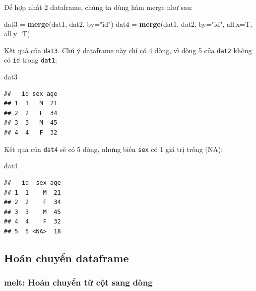 \documentclass[
]{book}
\newenvironment{Shaded}{\begin{snugshade}}{\end{snugshade}}
\newcommand{\DataTypeTok}[1]{\textcolor[rgb]{0.13,0.29,0.53}{#1}}
\newcommand{\KeywordTok}[1]{\textcolor[rgb]{0.13,0.29,0.53}{\textbf{#1}}}
\newcommand{\NormalTok}[1]{#1}
\newcommand{\StringTok}[1]{\textcolor[rgb]{0.31,0.60,0.02}{#1}}
\begin{document}
Để hợp nhất 2 dataframe, chúng ta dùng hàm merge như sau:

\begin{Shaded}
\begin{Highlighting}[]
\NormalTok{dat3 =}\StringTok{ }\KeywordTok{merge}\NormalTok{(dat1, dat2, }\DataTypeTok{by=}\StringTok{"id"}\NormalTok{)}
\NormalTok{dat4 =}\StringTok{ }\KeywordTok{merge}\NormalTok{(dat1, dat2, }\DataTypeTok{by=}\StringTok{"id"}\NormalTok{, }\DataTypeTok{all.x=}\NormalTok{T, }\DataTypeTok{all.y=}\NormalTok{T)}
\end{Highlighting}
\end{Shaded}

Kết quả của \texttt{dat3}. Chú ý dataframe này chỉ có 4 dòng, vì dòng 5 của \texttt{dat2} không có \texttt{id} trong \texttt{dat1}:

\begin{Shaded}
\begin{Highlighting}[]
\NormalTok{dat3}
\end{Highlighting}
\end{Shaded}

\begin{verbatim}
##   id sex age
## 1  1   M  21
## 2  2   F  34
## 3  3   M  45
## 4  4   F  32
\end{verbatim}

Kết quả của \texttt{dat4} sẽ có 5 dòng, nhưng biến \texttt{sex} có 1 giá trị trống (NA):

\begin{Shaded}
\begin{Highlighting}[]
\NormalTok{dat4}
\end{Highlighting}
\end{Shaded}

\begin{verbatim}
##   id  sex age
## 1  1    M  21
## 2  2    F  34
## 3  3    M  45
## 4  4    F  32
## 5  5 <NA>  18
\end{verbatim}

\hypertarget{houxe1n-chuyux1ec3n-dataframe}{%
\subsection{Hoán chuyển dataframe}\label{houxe1n-chuyux1ec3n-dataframe}}

\hypertarget{melt-houxe1n-chuyux1ec3n-tux1eeb-cux1ed9t-sang-duxf2ng}{%
\subsubsection*{melt: Hoán chuyển từ cột sang dòng}\label{melt-houxe1n-chuyux1ec3n-tux1eeb-cux1ed9t-sang-duxf2ng}}
\end{document}
